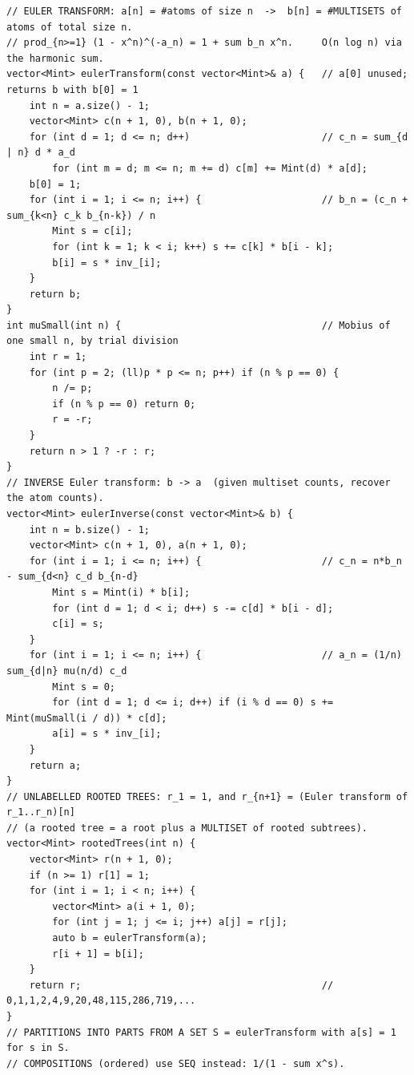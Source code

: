 \documentclass[9pt,a4paper,twocolumn]{extarticle}
\begin{document}
\begin{lstlisting}
// EULER TRANSFORM: a[n] = #atoms of size n  ->  b[n] = #MULTISETS of atoms of total size n.
// prod_{n>=1} (1 - x^n)^(-a_n) = 1 + sum b_n x^n.     O(n log n) via the harmonic sum.
vector<Mint> eulerTransform(const vector<Mint>& a) {   // a[0] unused; returns b with b[0] = 1
    int n = a.size() - 1;
    vector<Mint> c(n + 1, 0), b(n + 1, 0);
    for (int d = 1; d <= n; d++)                       // c_n = sum_{d | n} d * a_d
        for (int m = d; m <= n; m += d) c[m] += Mint(d) * a[d];
    b[0] = 1;
    for (int i = 1; i <= n; i++) {                     // b_n = (c_n + sum_{k<n} c_k b_{n-k}) / n
        Mint s = c[i];
        for (int k = 1; k < i; k++) s += c[k] * b[i - k];
        b[i] = s * inv_[i];
    }
    return b;
}
int muSmall(int n) {                                   // Mobius of one small n, by trial division
    int r = 1;
    for (int p = 2; (ll)p * p <= n; p++) if (n % p == 0) {
        n /= p;
        if (n % p == 0) return 0;
        r = -r;
    }
    return n > 1 ? -r : r;
}
// INVERSE Euler transform: b -> a  (given multiset counts, recover the atom counts).
vector<Mint> eulerInverse(const vector<Mint>& b) {
    int n = b.size() - 1;
    vector<Mint> c(n + 1, 0), a(n + 1, 0);
    for (int i = 1; i <= n; i++) {                     // c_n = n*b_n - sum_{d<n} c_d b_{n-d}
        Mint s = Mint(i) * b[i];
        for (int d = 1; d < i; d++) s -= c[d] * b[i - d];
        c[i] = s;
    }
    for (int i = 1; i <= n; i++) {                     // a_n = (1/n) sum_{d|n} mu(n/d) c_d
        Mint s = 0;
        for (int d = 1; d <= i; d++) if (i % d == 0) s += Mint(muSmall(i / d)) * c[d];
        a[i] = s * inv_[i];
    }
    return a;
}
// UNLABELLED ROOTED TREES: r_1 = 1, and r_{n+1} = (Euler transform of r_1..r_n)[n]
// (a rooted tree = a root plus a MULTISET of rooted subtrees).
vector<Mint> rootedTrees(int n) {
    vector<Mint> r(n + 1, 0);
    if (n >= 1) r[1] = 1;
    for (int i = 1; i < n; i++) {
        vector<Mint> a(i + 1, 0);
        for (int j = 1; j <= i; j++) a[j] = r[j];
        auto b = eulerTransform(a);
        r[i + 1] = b[i];
    }
    return r;                                          // 0,1,1,2,4,9,20,48,115,286,719,...
}
// PARTITIONS INTO PARTS FROM A SET S = eulerTransform with a[s] = 1 for s in S.
// COMPOSITIONS (ordered) use SEQ instead: 1/(1 - sum x^s).
\end{lstlisting}

\filbreak
\end{document}
